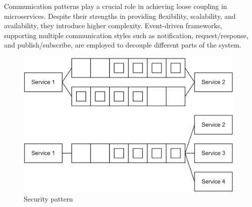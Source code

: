 Communication patterns play a crucial role in achieving loose coupling in microservices. 
Despite their strengths in providing flexibility, scalability, and availability, they introduce higher complexity. 
Event-driven frameworks, supporting multiple communication styles such as notification, request/response, and publish/subscribe, are employed to decouple different parts of the system.
\begin{figure}[H]
    \centering
    \includegraphics[width=0.75\linewidth]{images/cp.png}
    \caption{Security pattern}
\end{figure}
\newpage
